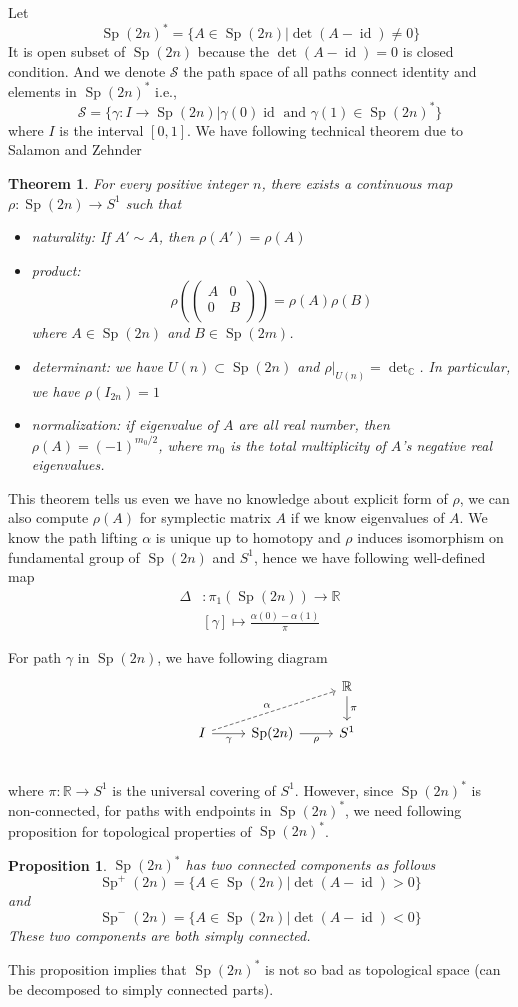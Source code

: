 \documentclass[a4paper,11pt]{amsart}
\DeclareMathOperator{\Sp}{Sp}
\DeclareMathOperator{\id}{id}
\theoremstyle{plain}
\theoremstyle{theorem}
\newtheorem{prop}{Proposition}[subsection]
\newtheorem{thm}{Theorem}[subsection]
\theoremstyle{definition}
\begin{document}
Let
\[
\Sp(2n)^* = \big\{A \in \Sp(2n)\big| \det(A-\id) \neq 0 \}
\]
It is open subset of $\Sp(2n)$ because the $\det(A-\id)=0$ is closed condition. And we denote $\mathcal{S}$ the path space of all paths connect identity and elements in $\Sp(2n)^*$ i.e., 
\[
\mathcal{S}= \big\{\gamma\colon I \to \Sp(2n) \big| \gamma(0) \id \text{ and } \gamma(1) \in \Sp(2n)^* \}
\]
where $I$ is the interval $[0,1]$. We have following technical theorem due to Salamon and Zehnder
\begin{thm}
	For every positive integer $n$, there exists a continuous map $\rho \colon \Sp(2n) \to S^1$ such that 
	\begin{itemize}
		\item naturality: If $A' \sim A$, then $\rho(A') = \rho (A)$
		\item product: \[
		\rho(\begin{pmatrix}
		A& 0 \\
		0& B\\
		\end{pmatrix}) = \rho(A) \rho(B)
		\] where $A \in \Sp(2n)$ and $B \in \Sp(2m)$.
		\item determinant: we have $U(n) \subset \Sp(2n)$ and $\rho|_{U(n)} = \det_{\mathbb{C}}$. In particular, we have $\rho(I_{2n}) = 1$                          
		\item normalization: if eigenvalue of $A$ are all real number, then $\rho(A) = (-1)^{m_0/2}$, where $m_0$ is the total multiplicity of $A$'s negative real eigenvalues.
	\end{itemize}
\end{thm}
This theorem tells us even we have no knowledge about explicit form of $\rho$, we can also compute $\rho(A)$ for symplectic matrix $A$ if we know eigenvalues of $A$. We know the path lifting $\alpha$ is unique up to homotopy and $\rho$ induces isomorphism on fundamental group of $\Sp(2n)$ and $S^1$, hence we have following well-defined map
\[
\begin{aligned}
 \Delta &\colon \pi_1(\Sp(2n)) \to \mathbb{R}\\
 &[\gamma] \mapsto \frac{\alpha(0) -\alpha(1)}{\pi}
\end{aligned}
\]

For path $\gamma$ in $\Sp(2n)$, we have following diagram
\[\begin{tikzcd}
	& & & \mathbb{R} \ar[d,"\pi"]\\
	&I \ar[r,"\gamma"'] \ar[rru,dashed,"\alpha"]& \Sp(2n) \ar[r,"\rho"'] & S^1\\
\end{tikzcd}\]
where $\pi \colon \mathbb{R} \to S^1$ is the universal covering of $S^1$. However, since $\Sp(2n)^*$ is non-connected, for paths with endpoints in $\Sp(2n)^*$, we need following proposition for topological properties of $\Sp(2n)^*$.
\begin{prop}
	$\Sp(2n)^*$ has two connected components as follows\[
	\Sp^+(2n) = \big\{A \in \Sp(2n)\big| \det(A-\id) > 0 \}
	\]
	and
	\[
	\Sp^-(2n) = \{A \in \Sp(2n)\big| \det(A-\id) < 0 \}
	\] These two components are both simply connected.
\end{prop}
This proposition implies that $\Sp(2n)^*$ is not so bad as topological space (can be decomposed to simply connected parts).
\end{document}
